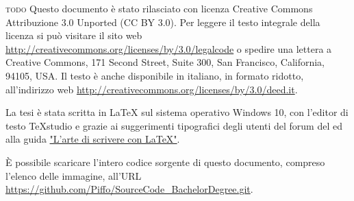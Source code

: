 
	\thispagestyle{empty}
	\hfill
	\vfill
	\textsc{todo}
	Questo documento è stato rilasciato con licenza Creative Commons Attribuzione
	3.0 Unported (CC BY 3.0). Per leggere il testo integrale della licenza si può
	visitare il sito web \url{http://creativecommons.org/licenses/by/3.0/legalcode}
	o spedire una lettera a Creative Commons, 171 Second Street, Suite 300, San
	Francisco, California, 94105, USA. Il testo è anche disponibile in italiano, in
	formato ridotto, all'indirizzo web
	\url{http://creativecommons.org/licenses/by/3.0/deed.it}.
	
	La tesi è stata scritta in \LaTeX{} sul sistema operativo Windows 10, con
	l'editor di testo TeXstudio e grazie ai suggerimenti tipografici degli utenti
	del forum del \GuIT ed alla guida 
	\href{http://www.lorenzopantieri.net/LaTeX_files/ArteLaTeX.pdf}{"L'arte di scrivere con \LaTeX{}"}.
	
	È possibile scaricare l'intero codice sorgente di questo documento, compreso l'elenco delle immagine, all'URL
	\url{https://github.com/Piffo/SourceCode_BachelorDegree.git}.

